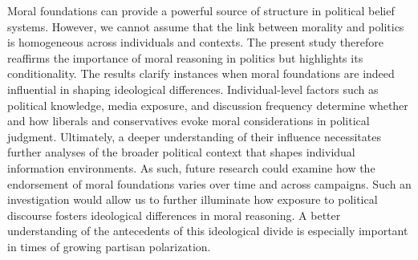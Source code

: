\documentclass[12pt]{article}
\begin{document}
Moral foundations can provide a powerful source of structure in political belief systems. However, we cannot assume that the link between morality and politics is homogeneous across individuals and contexts. The present study therefore reaffirms the importance of moral reasoning in politics but highlights its conditionality. The results clarify instances when moral foundations are indeed influential in shaping ideological differences. Individual-level factors such as political knowledge, media exposure, and discussion frequency determine whether and how liberals and conservatives evoke moral considerations in political judgment. Ultimately, a deeper understanding of their influence necessitates further analyses of the broader political context that shapes individual information environments. As such, future research could examine how the endorsement of moral foundations varies over time and across campaigns. Such an investigation would allow us to further illuminate how exposure to political discourse fosters ideological differences in moral reasoning. A better understanding of the antecedents of this ideological divide is especially important in times of growing partisan polarization.

\clearpage


\end{document}
